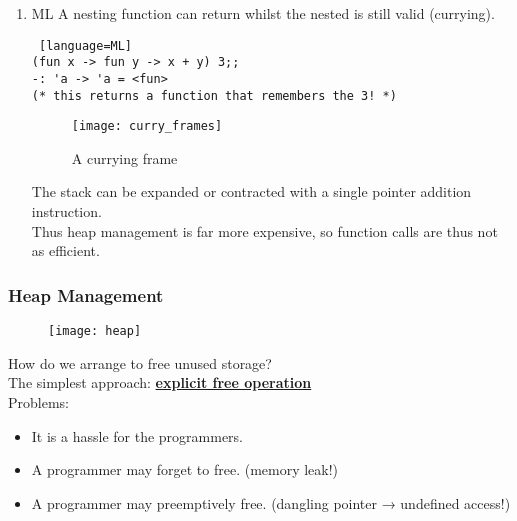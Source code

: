 \documentclass[../../lecture_notes.tex]{subfiles}
\begin{document}
\begin{enumerate} [itemsep=0mm]
		To make this work, functions are represented by a pair of pointers
			\begin{enumerate} [itemsep=0mm]
				\item a pointer to the code (ip)
				\item a pointer to the defining frame (op)
			\end{enumerate}

		A function is thus an (ip, op) pair.\\
		These pointers are called FAT, since they hold two words as opposed to thin C pointers.\\
		This is how continuations work!

	\item ML
	A nesting function can return whilst the nested is still valid (currying).
		\begin{lstlisting} [language=ML]
(fun x -> fun y -> x + y) 3;;
-: 'a -> 'a = <fun>
(* this returns a function that remembers the 3! *)
		\end{lstlisting}

	\begin{figure}[H]
		\centering
		\texttt{[image: curry\_frames]}
		\caption{A currying frame}
		\label{fig:test}
	\end{figure}

\noindent The stack can be expanded or contracted with a single pointer addition instruction.\\
Thus heap management is far more expensive, so function calls are thus not as efficient.
\end{enumerate}

\subsubsection*{Heap Management}

\begin{figure}[H]
	\centering
	\texttt{[image: heap]}
	\caption{}
	\label{fig:test}
\end{figure}

How do we arrange to free unused storage?\\
The simplest approach: \textbf{\underline{explicit free operation}}\\
	\indent Problems: \begin{itemize} [itemsep=0mm]
		\item It is a hassle for the programmers.
		\item A programmer may forget to free. (memory leak!)
		\item A programmer may preemptively free. (dangling pointer → undefined access!)
	\end{itemize}
\end{document}
